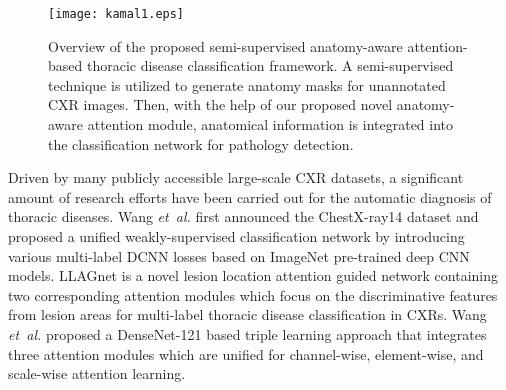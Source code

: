\documentclass[journal]{IEEEtran}
\newcommand{\etal}{\emph{et~al.}}
\begin{document}
\begin{figure}[t]
    \centering
	\texttt{[image: kamal1.eps]}
    \caption{Overview of the proposed semi-supervised anatomy-aware attention-based thoracic disease classification framework. A semi-supervised technique is utilized to generate anatomy masks for unannotated CXR images. Then, with the help of our proposed novel anatomy-aware attention module, anatomical information is integrated into the classification network for pathology detection.}
    \label{overall_framework}
\end{figure}
Driven by many publicly accessible large-scale CXR datasets, a significant amount of research efforts have been carried out for the automatic diagnosis of thoracic diseases. Wang \etal \cite{8099852} first announced the ChestX-ray14 dataset and proposed a unified weakly-supervised classification network by introducing various multi-label DCNN losses based on ImageNet pre-trained deep CNN models. LLAGnet \cite{Chen2020LesionLA} is a novel lesion location attention guided network containing two corresponding attention modules which focus on the discriminative features from lesion areas for multi-label thoracic disease classification in CXRs. Wang \etal \cite{wang2020triple} proposed a DenseNet-121 based triple learning approach that integrates three attention modules which are unified for channel-wise, element-wise, and scale-wise attention learning. \par
\end{document}
